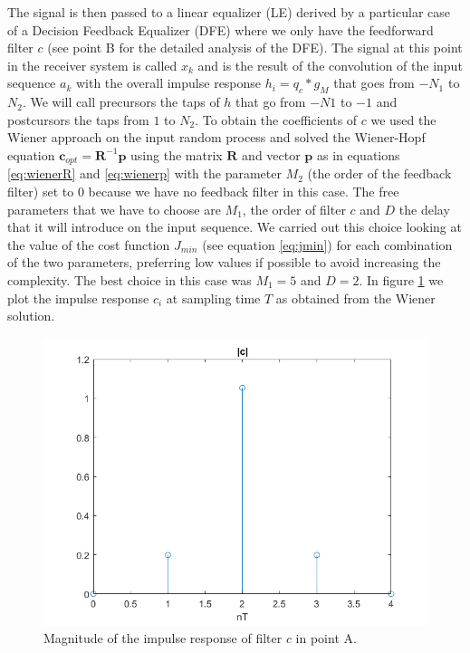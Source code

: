 \documentclass[a4paper,11.5pt]{article}
\newcommand{\vt}{\boldsymbol}
\begin{document}
The signal is then passed to a linear equalizer (LE) derived by a particular case of a Decision Feedback Equalizer (DFE) where we only have the feedforward filter $c$ (see point B for the detailed analysis of the DFE). The signal at this point in the receiver system is called $x_k$ and is the result of the convolution of the input sequence $a_k$ with the overall impulse response $h_i = q_c * g_M$ that goes from $-N_1$ to $N_2$. We will call precursors the taps of $h$ that go from $-N1$ to $-1$ and postcursors the taps from $1$ to $N_2$. To obtain the coefficients of $c$ we used the Wiener approach on the input random process and solved the Wiener-Hopf equation $\vt{c}_{opt}=\vt{R}^{-1}\vt{p}$ using the matrix $\vt{R}$ and vector $\vt{p}$ as in equations \ref{eq:wienerR} and \ref{eq:wienerp} with the parameter $M_2$ (the order of the feedback filter) set to $0$ because we have no feedback filter in this case. The free parameters that we have to choose are $M_1$, the order of filter $c$ and $D$ the delay that it will introduce on the input sequence. We carried out this choice looking at the value of the cost function $J_{min}$ (see equation \ref{eq:jmin}) for each combination of the two parameters, preferring low values if possible to avoid increasing the complexity. The best choice in this case was $M_1=5$ and $D=2$.
In figure \ref{fig:A_c} we plot the impulse response $c_i$ at sampling time $T$ as obtained from the Wiener solution. 

\begin{figure}[H]
	\begin{center}   
		\includegraphics[width=\textwidth]{figs/A_c.png} 
		\caption{Magnitude of the impulse response of filter $c$ in point A.}
		\label{fig:A_c}
	\end{center}
\end{figure}
\end{document}
